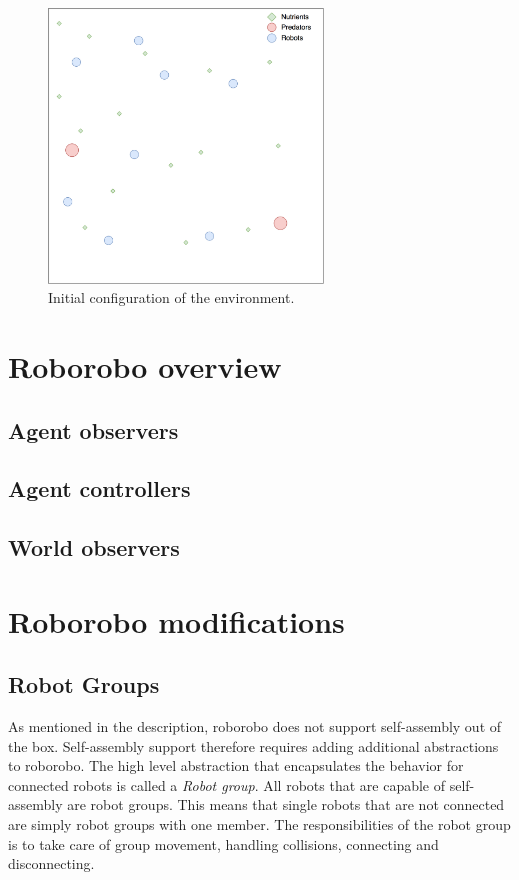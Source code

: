 \begin{figure}[H]
	
	\centering
	\includegraphics[width=0.65\textwidth]{chapters/res/Environment.png}
	\caption{Initial configuration of the environment.}
	\label{fig:environment}
\end{figure}

\section{Roborobo overview}
	\subsection{Agent observers}
	\subsection{Agent controllers}
	\subsection{World observers}

\clearpage

\section{Roborobo modifications}
	\subsection{Robot Groups}
	As mentioned in the description, roborobo does not support self-assembly out of the box.
	Self-assembly support therefore requires adding additional abstractions to roborobo.
	The high level abstraction that encapsulates the behavior for connected robots is called a \emph{Robot group}.
	All robots that are capable of self-assembly are robot groups.
	This means that single robots that are not connected are simply robot groups with one member.
	The responsibilities of the robot group is to take care of group movement, handling collisions, connecting and disconnecting. 

